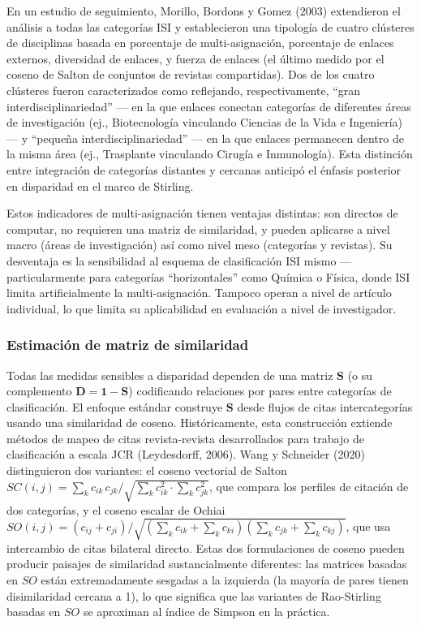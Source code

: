 \documentclass[
]{article}
\begin{document}
En un estudio de seguimiento, Morillo, Bordons y Gomez (2003)
extendieron el análisis a todas las categorías ISI y establecieron una
tipología de cuatro clústeres de disciplinas basada en porcentaje de
multi-asignación, porcentaje de enlaces externos, diversidad de enlaces,
y fuerza de enlaces (el último medido por el coseno de Salton de
conjuntos de revistas compartidas). Dos de los cuatro clústeres fueron
caracterizados como reflejando, respectivamente, ``gran
interdisciplinariedad'' --- en la que enlaces conectan categorías de
diferentes áreas de investigación (ej., Biotecnología vinculando
Ciencias de la Vida e Ingeniería) --- y ``pequeña
interdisciplinariedad'' --- en la que enlaces permanecen dentro de la
misma área (ej., Trasplante vinculando Cirugía e Inmunología). Esta
distinción entre integración de categorías distantes y cercanas anticipó
el énfasis posterior en disparidad en el marco de Stirling.

Estos indicadores de multi-asignación tienen ventajas distintas: son
directos de computar, no requieren una matriz de similaridad, y pueden
aplicarse a nivel macro (áreas de investigación) así como nivel meso
(categorías y revistas). Su desventaja es la sensibilidad al esquema de
clasificación ISI mismo --- particularmente para categorías
``horizontales'' como Química o Física, donde ISI limita artificialmente
la multi-asignación. Tampoco operan a nivel de artículo individual, lo
que limita su aplicabilidad en evaluación a nivel de investigador.

\hypertarget{estimaciuxf3n-de-matriz-de-similaridad}{%
\subsubsection{Estimación de matriz de
similaridad}\label{estimaciuxf3n-de-matriz-de-similaridad}}

Todas las medidas sensibles a disparidad dependen de una matriz
\(\mathbf{S}\) (o su complemento
\(\mathbf{D} = \mathbf{1} - \mathbf{S}\)) codificando relaciones por
pares entre categorías de clasificación. El enfoque estándar construye
\(\mathbf{S}\) desde flujos de citas intercategorías usando una
similaridad de coseno. Históricamente, esta construcción extiende
métodos de mapeo de citas revista-revista desarrollados para trabajo de
clasificación a escala JCR (Leydesdorff, 2006). Wang y Schneider (2020)
distinguieron dos variantes: el coseno vectorial de Salton
\(SC(i,j) = \sum_k c_{ik}\, c_{jk} / \sqrt{\sum_k c_{ik}^2 \cdot \sum_k c_{jk}^2}\),
que compara los perfiles de citación de dos categorías, y el coseno
escalar de Ochiai
\(SO(i,j) = (c_{ij} + c_{ji}) / \sqrt{(\sum_k c_{ik} + \sum_k c_{ki})(\sum_k c_{jk} + \sum_k c_{kj})}\),
que usa intercambio de citas bilateral directo. Estas dos formulaciones
de coseno pueden producir paisajes de similaridad sustancialmente
diferentes: las matrices basadas en \(SO\) están extremadamente sesgadas
a la izquierda (la mayoría de pares tienen disimilaridad cercana a 1),
lo que significa que las variantes de Rao-Stirling basadas en \(SO\) se
aproximan al índice de Simpson en la práctica.
\end{document}

